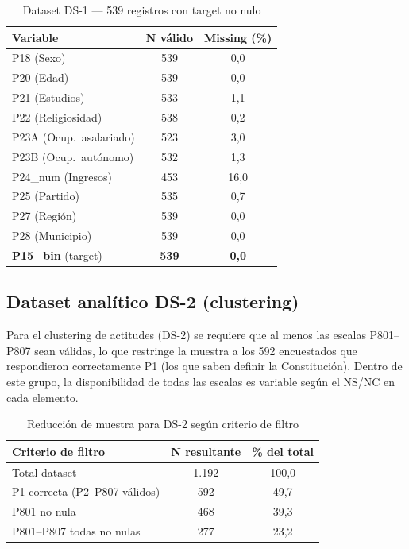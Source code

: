 \documentclass[12pt,a4paper]{article}
\newcommand{\thead}[1]{\cellcolor{tableheader}\color{white}\textbf{#1}}
\begin{document}
\begin{table}[H]
\centering
\renewcommand{\arraystretch}{1.3}
\begin{tabular}{lcc}
\toprule
\thead{Variable} & \thead{N válido} & \thead{Missing (\%)} \\
\midrule
P18 (Sexo)               & 539 &  0,0 \\
\rowcolor{tablerow}
P20 (Edad)               & 539 &  0,0 \\
P21 (Estudios)           & 533 &  1,1 \\
\rowcolor{tablerow}
P22 (Religiosidad)       & 538 &  0,2 \\
P23A (Ocup.\ asalariado) & 523 &  3,0 \\
\rowcolor{tablerow}
P23B (Ocup.\ autónomo)   & 532 &  1,3 \\
P24\_num (Ingresos)      & 453 & 16,0 \\
\rowcolor{tablerow}
P25 (Partido)            & 535 &  0,7 \\
P27 (Región)             & 539 &  0,0 \\
\rowcolor{tablerow}
P28 (Municipio)          & 539 &  0,0 \\
\midrule
\textbf{P15\_bin} (target) & \textbf{539} & \textbf{0,0} \\
\bottomrule
\end{tabular}
\caption{Dataset DS-1 — 539 registros con target no nulo}
\end{table}

\subsection{Dataset analítico DS-2 (clustering)}

Para el clustering de actitudes (DS-2) se requiere que al menos las escalas P801--P807 sean válidas, lo que restringe la muestra a los 592 encuestados que respondieron correctamente P1 (los que saben definir la Constitución). Dentro de este grupo, la disponibilidad de todas las escalas es variable según el NS/NC en cada elemento.

\begin{table}[H]
\centering
\renewcommand{\arraystretch}{1.3}
\begin{tabular}{lcc}
\toprule
\thead{Criterio de filtro} & \thead{N resultante} & \thead{\% del total} \\
\midrule
Total dataset              & 1.192 & 100,0 \\
\rowcolor{tablerow}
P1 correcta (P2--P807 válidos) & 592 &  49,7 \\
P801 no nula               &  468 &  39,3 \\
\rowcolor{tablerow}
P801--P807 todas no nulas  &  277 &  23,2 \\
\bottomrule
\end{tabular}
\caption{Reducción de muestra para DS-2 según criterio de filtro}
\end{table}
\end{document}
